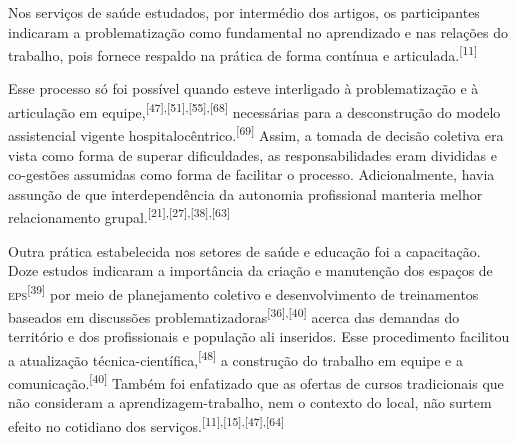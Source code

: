 \documentclass{article}
\begin{document}
Nos serviços de saúde estudados, por intermédio dos artigos, os participantes
indicaram a problematização como fundamental no aprendizado e nas relações do
trabalho, pois fornece respaldo na prática de forma contínua e articulada.\textsuperscript{[}\textsuperscript{11}\textsuperscript{]}

Esse processo só foi possível quando esteve interligado à problematização e à
articulação em equipe,\textsuperscript{[}\textsuperscript{47}\textsuperscript{]}\textsuperscript{,}\textsuperscript{[}\textsuperscript{51}\textsuperscript{]}\textsuperscript{,}\textsuperscript{[}\textsuperscript{55}\textsuperscript{]}\textsuperscript{,}\textsuperscript{[}\textsuperscript{68}\textsuperscript{]}
necessárias para a desconstrução do modelo assistencial vigente
hospitalocêntrico.\textsuperscript{[}\textsuperscript{69}\textsuperscript{]}
Assim, a tomada de decisão coletiva era vista como forma de superar
dificuldades, as responsabilidades eram divididas e co-gestões assumidas como
forma de facilitar o processo. Adicionalmente, havia assunção de que
interdependência da autonomia profissional manteria melhor relacionamento
grupal.\textsuperscript{[}\textsuperscript{21}\textsuperscript{]}\textsuperscript{,}\textsuperscript{[}\textsuperscript{27}\textsuperscript{]}\textsuperscript{,}\textsuperscript{[}\textsuperscript{38}\textsuperscript{]}\textsuperscript{,}\textsuperscript{[}\textsuperscript{63}\textsuperscript{]}

Outra prática estabelecida nos setores de saúde e educação foi a capacitação.
Doze estudos indicaram a importância da criação e manutenção dos espaços de \textsc{eps}\textsuperscript{[}\textsuperscript{39}\textsuperscript{]}
por meio de planejamento coletivo e desenvolvimento de treinamentos baseados em
discussões problematizadoras\textsuperscript{[}\textsuperscript{36}\textsuperscript{]}\textsuperscript{,}\textsuperscript{[}\textsuperscript{40}\textsuperscript{]}
acerca das demandas do território e dos profissionais e população ali inseridos.
Esse procedimento facilitou a atualização técnica-científica,\textsuperscript{[}\textsuperscript{48}\textsuperscript{]}
a construção do trabalho em equipe e a comunicação.\textsuperscript{[}\textsuperscript{40}\textsuperscript{]}
Também foi enfatizado que as ofertas de cursos tradicionais que não consideram a
aprendizagem-trabalho, nem o contexto do local, não surtem efeito no cotidiano
dos serviços.\textsuperscript{[}\textsuperscript{11}\textsuperscript{]}\textsuperscript{,}\textsuperscript{[}\textsuperscript{15}\textsuperscript{]}\textsuperscript{,}\textsuperscript{[}\textsuperscript{47}\textsuperscript{]}\textsuperscript{,}\textsuperscript{[}\textsuperscript{64}\textsuperscript{]}
\end{document}
